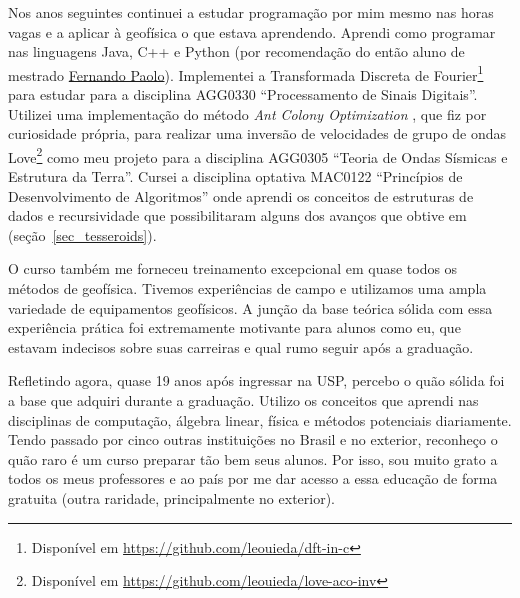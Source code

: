 \documentclass[10pt,a4paper,oneside]{book}
\begin{document}
Nos anos seguintes continuei a estudar programação por mim mesmo nas horas
vagas e a aplicar à geofísica o que estava aprendendo.
Aprendi como programar nas linguagens Java, C++ e Python (por recomendação do
então aluno de mestrado \href{https://www.linkedin.com/in/fspaolo/}{Fernando Paolo}).
Implementei a Transformada Discreta de Fourier\footnote{Disponível em
\url{https://github.com/leouieda/dft-in-c}} para estudar para a disciplina
AGG0330 ``Processamento de Sinais Digitais''.
Utilizei uma implementação do método \textit{Ant Colony Optimization}
\citep{Socha2008}, que fiz por curiosidade própria, para realizar uma inversão
de velocidades de grupo de ondas
Love\footnote{Disponível em \url{https://github.com/leouieda/love-aco-inv}}
como meu projeto para a disciplina AGG0305 ``Teoria de Ondas Sísmicas e
Estrutura da Terra''.
Cursei a disciplina optativa MAC0122 ``Princípios de Desenvolvimento de
Algoritmos'' onde aprendi os conceitos de estruturas de dados e recursividade
que possibilitaram alguns dos avanços que obtive em \citet{Uieda2016}
(seção~\ref{sec_tesseroids}).

O curso também me forneceu treinamento excepcional em quase todos os métodos de
geofísica.
Tivemos experiências de campo e utilizamos uma ampla variedade de equipamentos
geofísicos.
A junção da base teórica sólida com essa experiência prática foi
extremamente motivante para alunos como eu, que estavam indecisos sobre suas
carreiras e qual rumo seguir após a graduação.

Refletindo agora, quase 19 anos após ingressar na USP, percebo o quão sólida
foi a base que adquiri durante a graduação. Utilizo os conceitos que aprendi
nas disciplinas de computação, álgebra linear, física e métodos potenciais
diariamente. Tendo passado por cinco outras instituições no Brasil e no
exterior, reconheço o quão raro é um curso preparar tão bem seus alunos.
Por isso, sou muito grato a todos os meus professores e ao país por me dar
acesso a essa educação de forma gratuita (outra raridade, principalmente no
exterior).
\end{document}
